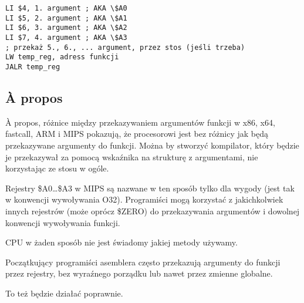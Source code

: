 \begin{lstlisting}[caption=MIPS (konwencja wywoływania O32),style=customasmMIPS]
LI $4, 1. argument ; AKA \$A0
LI $5, 2. argument ; AKA \$A1
LI $6, 3. argument ; AKA \$A2
LI $7, 4. argument ; AKA \$A3
; przekaż 5., 6., ... argument, przez stos (jeśli trzeba)
LW temp_reg, adress funkcji
JALR temp_reg
\end{lstlisting}

\subsection{À propos}

À propos, różnice między przekazywaniem argumentów funkcji w x86, x64, fastcall, ARM i MIPS pokazują, że procesorowi jest bez różnicy jak będą
przekazywane argumenty do funkcji. Można by stworzyć kompilator, który będzie je przekazywał za pomocą wskaźnika na strukturę z argumentami, nie korzystając ze stosu w ogóle.

Rejestry \$A0\dots \$A3 w MIPS są nazwane w ten sposób tylko dla wygody (jest tak w konwencji wywoływania O32).
Programiści mogą korzystać z jakichkolwiek innych rejestrów (może oprócz \$ZERO) do przekazywania argumentów i dowolnej konwencji wywoływania funkcji.

\ac{CPU} w żaden sposób nie jest świadomy jakiej metody używamy.

Początkujący programiści asemblera często przekazują argumenty do funkcji przez rejestry, bez wyraźnego porządku lub nawet przez zmienne globalne.

To też będzie działać poprawnie.


